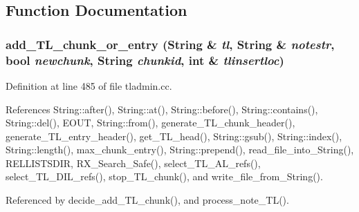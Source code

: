 \subsection{Function Documentation}
\subsubsection{ add\_\-TL\_\-chunk\_\-or\_\-entry ({\bf String} \& {\em tl}, {\bf String} \& {\em notestr}, bool {\em newchunk}, {\bf String} {\em chunkid}, int \& {\em tlinsertloc})}\label{tladmin_8cc_a9}




Definition at line 485 of file tladmin.cc.

References String::after(), String::at(), String::before(), String::contains(), String::del(), EOUT, String::from(), generate\_\-TL\_\-chunk\_\-header(), generate\_\-TL\_\-entry\_\-header(), get\_\-TL\_\-head(), String::gsub(), String::index(), String::length(), max\_\-chunk\_\-entry(), String::prepend(), read\_\-file\_\-into\_\-String(), RELLISTSDIR, RX\_\-Search\_\-Safe(), select\_\-TL\_\-AL\_\-refs(), select\_\-TL\_\-DIL\_\-refs(), stop\_\-TL\_\-chunk(), and write\_\-file\_\-from\_\-String().

Referenced by decide\_\-add\_\-TL\_\-chunk(), and process\_\-note\_\-TL().



